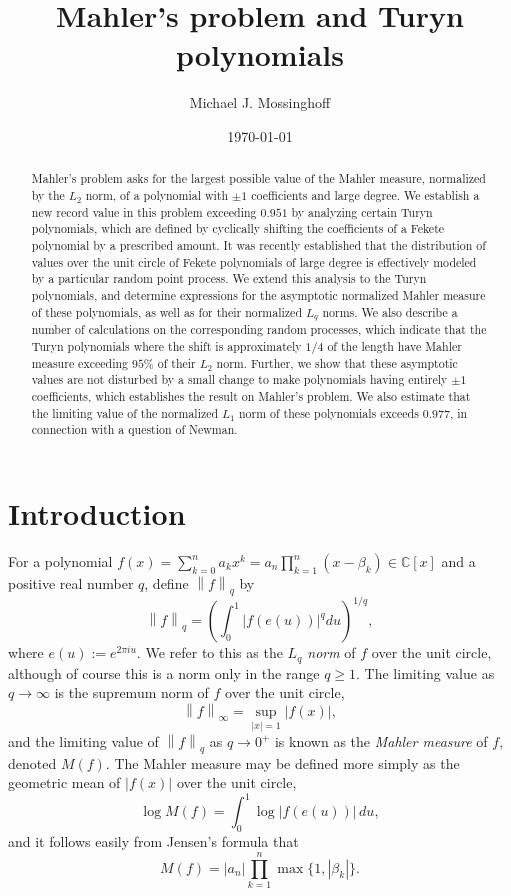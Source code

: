 \documentclass[reqno]{amsart}
\title{Mahler's problem and Turyn polynomials}
\author{Michael J. Mossinghoff}
\date{\today}
\numberwithin{equation}{section}
\numberwithin{table}{section}
\numberwithin{figure}{section}
\newcommand{\abs}[1]{\left\lvert#1\right\rvert}
\newcommand{\dbars}[1]{\left\lVert#1\right\rVert}
\begin{document}
\begin{abstract}
Mahler's problem asks for the largest possible value of the Mahler measure, normalized by the $L_2$ norm, of a polynomial with $\pm1$ coefficients and large degree.
We establish a new record value in this problem exceeding $0.951$ by analyzing certain Turyn polynomials, which are defined by cyclically shifting the coefficients of a Fekete polynomial by a prescribed amount.
It was recently established that the distribution of values over the unit circle of Fekete polynomials of large degree is effectively modeled by a particular random point process.
We extend this analysis to the Turyn polynomials, and determine expressions for the asymptotic normalized Mahler measure of these polynomials, as well as for their normalized $L_q$ norms.
We also describe a number of calculations on the corresponding random processes, which indicate that the Turyn polynomials where the shift is approximately $1/4$ of the length have Mahler measure exceeding $95\%$ of their $L_2$ norm.
Further, we show that these asymptotic values are not disturbed by a small change to make polynomials having entirely $\pm1$ coefficients, which establishes the result on Mahler's problem.
We also estimate that the limiting value of the normalized $L_1$ norm of these polynomials exceeds $0.977$, in connection with a question of Newman.
\end{abstract}

\maketitle


\section{Introduction}\label{secIntroduction}

For a polynomial $f(x)=\sum_{k=0}^n a_k x^k = a_n \prod_{k=1}^n (x-\beta_k)\in\mathbb{C}[x]$ and a positive real number $q$, define $\dbars{f}_q$ by
\[
\dbars{f}_q = \left(\int_0^1 \abs{f(e(u))}^q du\right)^{1/q},
\]
where $e(u) := e^{2\pi i u}$.
We refer to this as the \textit{$L_q$ norm} of $f$ over the unit circle, although of course this is a norm only in the range $q\geq1$.
The limiting value as $q\to\infty$ is the supremum norm of $f$ over the unit circle,
\[
\dbars{f}_\infty=\sup_{\abs{x}=1}\abs{f(x)},
\]
and the limiting value of $\dbars{f}_q$ as $q\to0^+$ is known as the \textit{Mahler measure} of $f$, denoted $M(f)$.
The Mahler measure may be defined more simply as the geometric mean of $\abs{f(x)}$ over the unit circle,
\[
\log M(f) = \int_0^1 \log\abs{f(e(u))} \, du,
\]
and it follows easily from Jensen's formula that
\[
M(f) =  \abs{a_n} \prod_{k=1}^n \max\{1, \abs{\beta_k}\}.
\]
\end{document}
